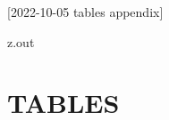 [2022-10-05 tables appendix]

\begin{VerbatimOut}{z.out}
\chapter{TABLES}
\end{VerbatimOut}

\MyIO


% 
% 
